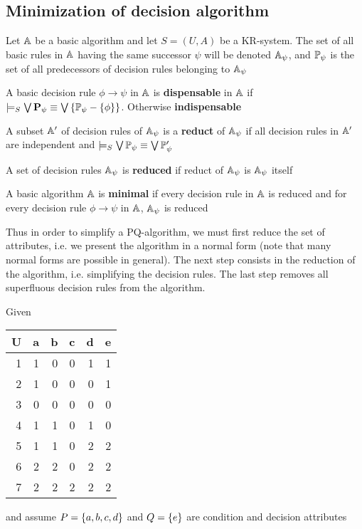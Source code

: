 \documentclass[11pt]{article}
\begin{document}
\subsection{Minimization of decision algorithm}
\label{sec:org401e754}
Let \(\A\) be a basic algorithm and let \(S=(U,A)\) be a KR-system. The set of all
basic rules in \(\A\) having the same successor \(\psi\) will be denoted
\(\A_\psi\), and \(\P_\psi\) is the set of all predecessors of decision rules
belonging to \(\A_\psi\)

A basic decision rule \(\phi\to\psi\) in \(\A\) is \textbf{dispensable} in \(\A\) if
\(\models_S\bigvee\bP_\psi\equiv\bigvee\lb\P_\psi-\lb\phi\rb\rb\). Otherwise
\textbf{indispensable}

A subset \(\A'\) of decision rules of \(\A_\psi\) is a \textbf{reduct} of \(\A_\psi\) if all
decision rules in \(\A'\) are independent and
\(\models_S\bigvee\P_\psi\equiv\bigvee\P'_\psi\) 

A set of decision rules \(\A_\psi\) is \textbf{reduced} if reduct of \(\A_\psi\) is
\(\A_\psi\) itself

A basic algorithm \(\A\) is \textbf{minimal} if every decision rule in \(\A\) is reduced
and for every decision rule \(\phi\to\psi\) in \(\A\), \(\A_\psi\) is reduced

Thus in order to simplify a PQ-algorithm, we must first reduce the set of
attributes, i.e. we present the algorithm in a normal form (note that many
normal forms are possible in general). The next step consists in the reduction
of the algorithm, i.e. simplifying the decision rules. The last step removes
all superfluous decision rules from the algorithm.


Given
\begin{center}
\begin{tabular}{rrrrrr}
U & a & b & c & d & e\\
\hline
1 & 1 & 0 & 0 & 1 & 1\\
2 & 1 & 0 & 0 & 0 & 1\\
3 & 0 & 0 & 0 & 0 & 0\\
4 & 1 & 1 & 0 & 1 & 0\\
5 & 1 & 1 & 0 & 2 & 2\\
6 & 2 & 2 & 0 & 2 & 2\\
7 & 2 & 2 & 2 & 2 & 2\\
\end{tabular}
\end{center}
and assume \(P=\lb a,b,c,d\rb\) and \(Q=\lb e\rb\) are condition and decision attributes
\end{document}
